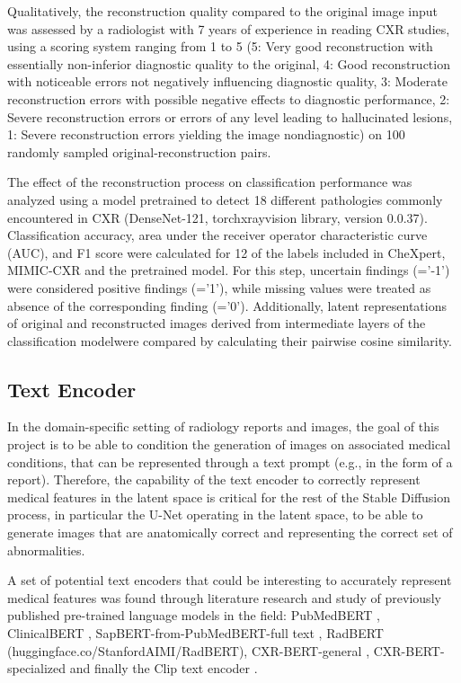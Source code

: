 \documentclass{article}
\begin{document}
Qualitatively, the reconstruction quality compared to the original image input was assessed by a radiologist with 7 years of experience in reading CXR studies, using a scoring system ranging from 1 to 5 (5: Very good reconstruction with essentially non-inferior diagnostic quality to the original, 4: Good reconstruction with noticeable errors not negatively influencing diagnostic quality, 3: Moderate reconstruction errors with possible negative effects to diagnostic performance, 2: Severe reconstruction errors or errors of any level leading to hallucinated lesions, 1: Severe reconstruction errors yielding the image nondiagnostic) on 100 randomly sampled original-reconstruction pairs. 

The effect of the reconstruction process on classification performance was analyzed using a model pretrained to detect 18 different pathologies commonly encountered in CXR (DenseNet-121, torchxrayvision library, version 0.0.37)\citep{Cohen2022xrv}\citep{Cohen2020multids}. Classification accuracy, area under the receiver operator characteristic curve (AUC), and F1 score were calculated for 12 of the labels included in CheXpert, MIMIC-CXR and the pretrained model. For this step, uncertain findings (='-1') were considered positive findings (='1'), while missing values were treated as absence of the corresponding finding (='0'). Additionally, latent representations of original and reconstructed images derived from intermediate layers of the classification modelwere compared by calculating their pairwise cosine similarity.

\subsection{Text Encoder}
\label{method-text-encoder}

In the domain-specific setting of radiology reports and images, the goal of this project is to be able to condition the generation of images on associated medical conditions, that can be represented through a text prompt (e.g., in the form of a report). Therefore, the capability of the text encoder to correctly represent medical features in the latent space is critical for the rest of the Stable Diffusion process, in particular the U-Net operating in the latent space, to be able to generate images that are anatomically correct and representing the correct set of abnormalities. 

A set of potential text encoders that could be interesting to accurately represent medical features was found through literature research and study of previously published pre-trained language models in the field: PubMedBERT \citep{Gu_2022}, ClinicalBERT \citep{https://doi.org/10.48550/arxiv.1904.05342}, SapBERT-from-PubMedBERT-full text \citep{liu-etal-2021-self}, RadBERT (huggingface.co/StanfordAIMI/RadBERT), CXR-BERT-general \citep{https://doi.org/10.48550/arxiv.2204.09817}, CXR-BERT-specialized \citep{https://doi.org/10.48550/arxiv.2204.09817} and finally the Clip text encoder \citep{https://doi.org/10.48550/arxiv.2103.00020}.
\end{document}

